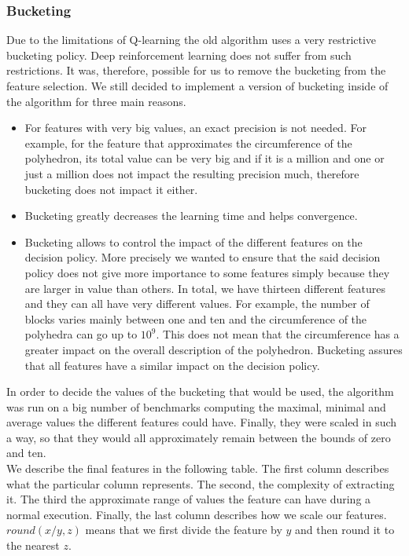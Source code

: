 \subsubsection{Bucketing}
Due to the limitations of Q-learning the old algorithm uses a very restrictive bucketing policy. Deep reinforcement learning does not suffer from such restrictions. It was, therefore, possible for us to remove the bucketing from the feature selection. We still decided to implement a version of bucketing inside of the algorithm for three main reasons. \\
\begin{itemize}
	\item For features with very big values, an exact precision is not needed. For example, for the feature that approximates the circumference of the polyhedron, its total value can be very big and if it is a million and one or just a million does not impact the resulting precision much, therefore bucketing does not impact it either.
	\item Bucketing greatly decreases the learning time and helps convergence.
	\item Bucketing allows to control the impact of the different features on the decision policy. More precisely we wanted to ensure that the said decision policy does not give more importance to some features simply because they are larger in value than others. In total, we have thirteen different features and they can all have very different values. For example, the number of blocks varies mainly between one and ten and the circumference of the polyhedra can go up to $10^9$. This does not mean that the circumference has a greater impact on the overall description of the polyhedron. Bucketing assures that all features have a similar impact on the decision policy.
\end{itemize}
In order to decide the values of the bucketing that would be used,  the algorithm was run on a big number of benchmarks computing the maximal, minimal and average values the different features could have. Finally, they were scaled in such a way, so that they would all approximately remain between the bounds of zero and ten.\\
We describe the final features in the following table. The first column describes what the particular column represents. The second, the complexity of extracting it. The third the approximate range of values the feature can have during a normal execution. Finally, the last column describes how we scale our features. $round(x/y,z)$ means that we first divide the feature by $y$ and then round it to the nearest $z$.
